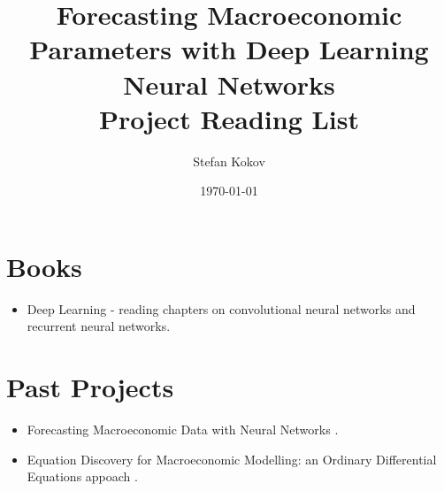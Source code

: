 \documentclass[10pt]{article}
\title{Forecasting Macroeconomic Parameters with Deep Learning Neural Networks \\ Project Reading List}
\date{\today}
\author{Stefan Kokov}
\begin{document}
\maketitle


\section{Books}
\begin{itemize}
	\item Deep Learning \cite{goodfellow_bengio_courville_2017} - reading chapters on convolutional neural networks and recurrent neural networks.
\end{itemize}


\section{Past Projects}
\begin{itemize}
	\item Forecasting Macroeconomic Data with Neural Networks \cite{bassi}.
	\item Equation Discovery for Macroeconomic Modelling: an Ordinary Differential Equations appoach \cite{Georgiev}.
\end{itemize}


\end{document}
